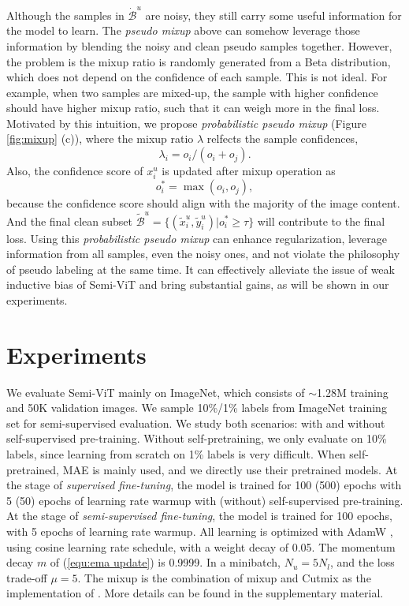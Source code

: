 \documentclass{article}
\begin{document}
Although the samples in $\dot{\mathcal{B}}^u$ are noisy, they still carry some useful information for the model to learn. The \emph{pseudo mixup} above can somehow leverage those information by blending the noisy and clean pseudo samples together. However, the problem is the mixup ratio is randomly generated from a Beta distribution, which does not depend on the confidence of each sample. This is not ideal. For example, when two samples are mixed-up, the sample with higher confidence should have higher mixup ratio, such that it can weigh more in the final loss. Motivated by this intuition, we propose \emph{probabilistic pseudo mixup} (Figure \ref{fig:mixup} (c)), where the mixup ratio $\lambda$ relfects the sample confidences,
\begin{equation}
    \lambda_i=o_i/(o_i+o_j).
\end{equation}
Also, the confidence score of $x^u_i$ is updated after mixup operation as
\begin{equation}
    o^*_i=\max(o_i,o_j),
\end{equation}
because the confidence score should align with the majority of the image content. And the final clean subset $\tilde{\mathcal{B}}^u=\{(\tilde{x}^u_i,\tilde{y}^u_i)|o^*_i\geq\tau\}$ will contribute to the final loss. Using this \emph{probabilistic pseudo mixup} can enhance regularization, leverage information from all samples, even the noisy ones, and not violate the philosophy of pseudo labeling at the same time. It can effectively alleviate the issue of weak inductive bias of Semi-ViT and bring substantial gains, as will be shown in our experiments. 


\section{Experiments}

We evaluate Semi-ViT mainly on ImageNet, which consists of $\sim$1.28M training and 50K validation images. We sample 10\%/1\% labels from ImageNet training set for semi-supervised evaluation. 
We study both scenarios: with and without self-supervised pre-training. Without self-pretraining, we only evaluate on 10\% labels, since learning from scratch on 1\% labels is very difficult. 
When self-pretrained, MAE \cite{he2021masked} is mainly used, and we directly use their pretrained models. At the stage of \emph{supervised fine-tuning}, the model is trained for 100 (500) epochs with 5 (50) epochs of learning rate warmup with (without) self-supervised pre-training.
At the stage of \emph{semi-supervised fine-tuning}, the model is trained for 100 epochs, with 5 epochs of learning rate warmup. All learning is optimized with AdamW \cite{DBLP:conf/iclr/LoshchilovH19}, using cosine learning rate schedule, with a weight decay of 0.05. The momentum decay $m$ of (\ref{equ:ema update}) is 0.9999. In a minibatch, $N_u=5N_l$, and the loss trade-off $\mu=5$. The mixup is the combination of mixup \cite{DBLP:conf/iclr/ZhangCDL18} and Cutmix \cite{DBLP:conf/iccv/YunHCOYC19} as the implementation of \cite{rw2019timm}. More details can be found in the supplementary material. 
\end{document}
